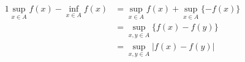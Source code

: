 \documentclass{jsarticle}
\makeatletter
\renewenvironment{proof}[1][\proofname]{\par
        \pushQED{\qed}
        \normalfont
        \topsep6\p@\@plus6\p@ \trivlist
        \item[\hskip\labelsep{\bfseries #1}\@addpunct{\bfseries}]\ignorespaces
    }{%
        \popQED\endtrivlist\@endpefalse
    }
\renewcommand{\proofname}{\underline{証明.}}
\makeatother
\begin{document}
\begin{proof}
    \begin{alignat}{1}
        \sup_{x \in A} f(x) - \inf_{x \in A} f(x)
            &= \sup_{x \in A} f(x) + \sup_{x \in A} \{-f(x)\} \\
            &= \sup_{x,y \in A} \{f(x) - f(y)\} \\
            &= \sup_{x,y \in A} |f(x) - f(y)|
    \end{alignat}
\end{proof}
\end{document}
